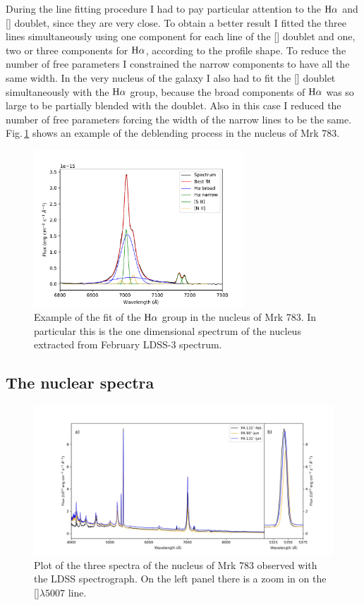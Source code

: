 \documentclass[../main.tex]{subfiles}
\begin{document}
During the line fitting procedure I had to pay particular attention to the $\rm H\alpha$ and [] doublet, since they are very close.
To obtain a better result I fitted the three lines simultaneously using one component for each line of the [] doublet and one, two or three components for $\rm H\alpha$, according to the profile shape.
To reduce the number of free parameters I constrained the narrow components to have all the same width.
In the very nucleus of the galaxy I also had to fit the [] doublet  simultaneously with the $\rm H\alpha$ group, because the broad components of $\rm H\alpha$ was so large to be partially blended with the doublet.
Also in this case I reduced the number of free parameters forcing the width of the narrow lines to be the same.
Fig.\,\ref{fig:pap3_deblending} shows an example of the deblending process in the nucleus of Mrk 783.

\begin{figure}
\centering
\includegraphics[width=0.7\textwidth]{images/paper3/deblending.pdf} 
\caption[]{Example of the fit of the $\rm H\alpha$ group in the nucleus of Mrk 783. In particular this is the one dimensional spectrum of the nucleus extracted from February LDSS-3 spectrum.} 
\label{fig:pap3_deblending}
\end{figure} 


\subsection{The nuclear spectra}

\begin{figure}
\centering
\includegraphics[width=\textwidth]{images/paper3/all_spectra.jpg} 
\caption[]{Plot of the three spectra of the nucleus of Mrk 783 observed with the LDSS spectrograph. On the left panel there is a zoom in on the []$\lambda5007$ line.} 
\label{fig:all_spectra}
\end{figure} 
\end{document}
